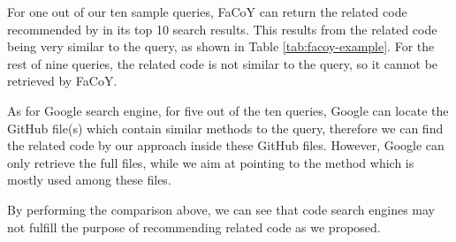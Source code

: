 For one out of our ten sample queries, {\ttt FaCoY} can return the related code recommended by {\tool} in its top 10 search results. This results from the related code being very similar to the query, as shown in Table \ref{tab:facoy-example}. For the rest of nine queries, the related code is not similar to the query, so it cannot be retrieved by {\ttt FaCoY}.

As for Google search engine, for five out of the ten queries, Google can locate the GitHub file(s) which contain similar methods to the query, therefore we can find the related code by our approach inside these GitHub files. However, Google can only retrieve the full files, while we aim at pointing to the method which is mostly used among these files. 

By performing the comparison above, we can see that code search engines may not fulfill the purpose of recommending related code as we proposed.
